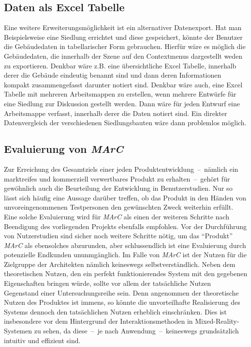 \subsection{Daten als Excel Tabelle}
Eine weitere Erweiterungsmöglichkeit ist ein alternativer Datenexport. Hat man Beispielsweise eine Siedlung errichtet und diese gespeichert, könnte der Benutzer die Gebäudedaten in tabellarischer Form gebrauchen. Hierfür wäre es möglich die Gebäudedaten, die innerhalb der Szene auf den Contextmenus dargestellt weden zu exportieren. Denkbar wäre z.B. eine übersichtliche Excel Tabelle, innerhalb derer die Gebäude eindeutig benannt sind und dann deren Informationen kompakt zusammengefasst darunter notiert sind. Denkbar wäre auch, eine Excel Tabelle mit mehreren Arbeitsmappen zu erstellen, wenn mehrere Entwürfe für eine Siedlung zur Diskussion gestellt werden. Dann wäre für jeden Entwurf eine Arbeitsmappe verfasst, innerhalb derer die Daten notiert sind. Ein direkter Datenvergleich der verschiedenen Siedlungsbauten wäre dann problemlos möglich.

\subsection{Evaluierung von \emph{MArC}}
Zur Erreichung des Gesamtziels einer jeden Produktentwicklung~--~nämlich ein markt\-rei\-fes und kommerziell verwertbares Produkt zu erhalten~--~gehört für gewöhnlich auch die Beurteilung der Entwicklung in Benutzerstudien. Nur so lässt sich häufig eine Aussage darüber treffen, ob das Produkt in den Händen von unvoreingenommenen Testpersonen den gewünschten Zweck weiterhin erfüllt.\\
Eine solche Evaluierung wird für \emph{MArC} als einen der weiteren Schritte nach Beendigung des vorliegenden Projekts ebenfalls empfohlen. Vor der Durchführung von Nutzerstudien sind sicher noch weitere Schritte nötig, um das "`Produkt"' \emph{MArC} als ebensolches abzurunden, aber schlussendlich ist eine Evaluierung durch potenzielle Endkunden ununmgänglich. Im Falle von \emph{MArC} ist der Nutzen für die Zielgruppe der Architekten nämlich keineswegs selbstverständlich. Neben dem theoretischen Nutzen, den ein perfekt funktionierendes System mit den gegebenen Eigenschaften bringen würde, sollte vor allem der tatsächliche Nutzen Gegenstand einer Untersuchungsreihe sein. Denn angenommen der theoretische Nutzen des Produktes ist immens, so könnte die unvorteilhafte Realisierung des Systems dennoch den tatsächlichen Nutzen erheblich einschränken. Dies ist insbesondere vor dem Hintergrund der Interaktionsmethoden in Mixed-Reality-Systemen zu sehen, da diese~--~je nach Anwendung~--~keineswegs grundsätzlich intuitiv und effizient sind.